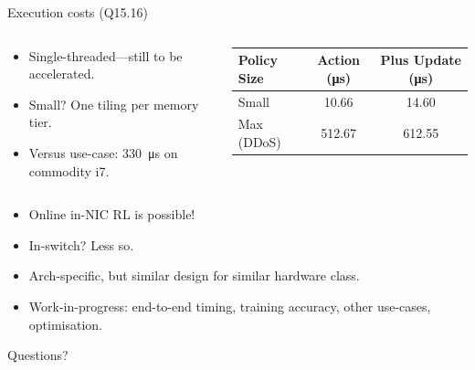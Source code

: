 \documentclass[aspectratio=169,xcolor={dvipsnames}
]{beamer}
\begin{document}

\begin{frame}{Execution costs (Q15.16)}
	\begin{columns}
		\begin{column}{0.4\linewidth}
			\begin{itemize}
				\item Single-threaded---still to be accelerated.
				\item Small? One tiling per memory tier.
				\item Versus use-case: \SI{330}{\micro\second} on commodity i7.
			\end{itemize}
		\end{column}
		\begin{column}{0.6\linewidth}
			\centering
			\begin{tabular}{ l c c }
				\toprule
				Policy Size & Action (\si{\micro\second}) & Plus Update (\si{\micro\second}) \\ \midrule
				Small & \num{10.66} & \num{14.60} \\
				Max (DDoS) & \num{512.67} & \num{612.55} \\ \bottomrule
			\end{tabular}
		\end{column}
	\end{columns}
\end{frame}

\begin{frame}[standout]
	\begin{itemize}
		\item Online in-NIC RL is possible!
		\item In-switch? Less so.
		\item Arch-specific, but similar design for similar hardware class.
		\item Work-in-progress: end-to-end timing, training accuracy, other use-cases, optimisation.
	\end{itemize}
	\alert{Questions?}
\end{frame}
\end{document}
